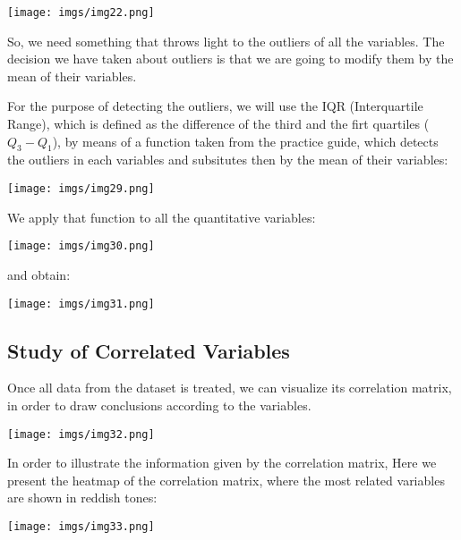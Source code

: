 \documentclass{article}
\begin{document}
\begin{center}
    {\texttt{[image: imgs/img22.png]}\par}
\end{center}

So, we need something that throws light to the outliers of all the variables. The decision we have 
taken about outliers is that we are going to modify them by the mean of their variables. 

For the purpose of detecting the outliers, we will use the IQR (Interquartile Range), which is 
defined as the difference of the third and the firt quartiles ($Q_{3}-Q_{1}$), by means of a function
taken from the practice guide, which detects the outliers in each variables and subsitutes then by
the mean of their variables:
\begin{center}
    {\texttt{[image: imgs/img29.png]}\par}
\end{center}

We apply that function to all the quantitative variables:

\begin{center}
    {\texttt{[image: imgs/img30.png]}\par}
\end{center}

and obtain:

\begin{center}
    {\texttt{[image: imgs/img31.png]}\par}
\end{center}


\subsection{Study of Correlated Variables}

Once all data from the dataset is treated, we can visualize its correlation matrix, in order to draw 
conclusions according to the variables.

\begin{center}
    {\texttt{[image: imgs/img32.png]}\par}
\end{center}

In order to illustrate the information given by the correlation matrix, Here 
we present the heatmap of the correlation matrix, where the most related variables 
are shown in reddish tones:
\begin{center}
    {\texttt{[image: imgs/img33.png]}\par}
\end{center}
\end{document}
